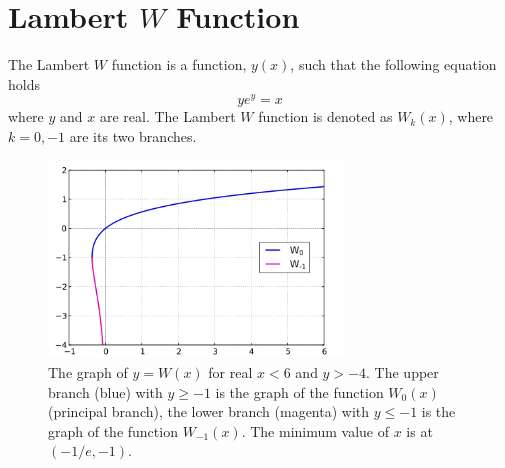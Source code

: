 \chapter{Lambert $W$ Function} \label{app:lambert-w}
\begin{definition}
    The Lambert $W$ function is a function, $y(x)$, such that the following equation holds
    \[ ye^y = x \]
    where $y$ and $x$ are real. The Lambert $W$ function is denoted as $W_k(x)$, where $k=0,-1$ are its two branches.
\end{definition}
\begin{figure} [htbp]
    \centering
    \includegraphics[width=0.7\textwidth]{img/lambert-w.png}
    \caption{The graph of $y=W(x)$ for real $x<6$ and $y>-4$. The upper branch (blue) with $y\geq-1$ is the graph of the function $W_0(x)$ (principal branch), the lower branch (magenta) with $y\leq -1$ is the graph of the function $W_{-1}(x)$. The minimum value of $x$ is at $(-1/e,-1)$.}
    \label{fig:lambert-w}
\end{figure}